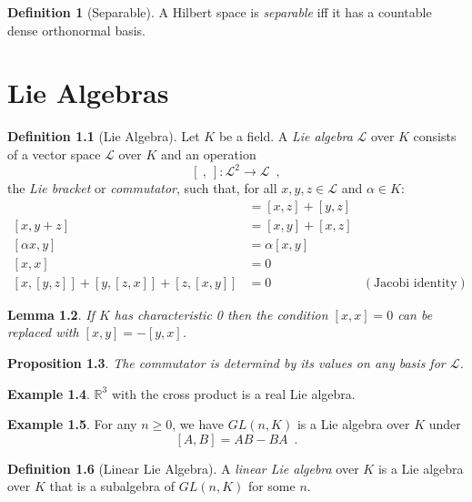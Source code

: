 \documentclass{book}
\newtheorem{prop}{Proposition}[chapter]
\newtheorem{lm}[prop]{Lemma}
\theoremstyle{definition}
\newtheorem{df}[prop]{Definition}
\newtheorem{ex}[prop]{Example}
\begin{document}
\begin{df}[Separable]
A Hilbert space is \emph{separable} iff it has a countable dense orthonormal basis.
\end{df}

\chapter{Lie Algebras}

\begin{df}[Lie Algebra]
Let $K$ be a field.
A \emph{Lie algebra} $\mathcal{L}$ over $K$ consists of a vector space $\mathcal{L}$ over $K$ and an operation
\[ [\ ,\ ] : \mathcal{L}^2 \rightarrow \mathcal{L} \enspace , \]
the \emph{Lie bracket} or \emph{commutator}, such that, for all $x,y,z \in \mathcal{L}$ and $\alpha \in K$:
\begin{align*}
[x+y,z] & = [x,z] + [y,z] \\
[x,y+z] & = [x,y] + [x,z] \\
[\alpha x,y] & = \alpha [x,y] \\
[x,x] & = 0 \\
[x,[y,z]] + [y,[z,x]] + [z,[x,y]] & = 0 & (\text{Jacobi identity})
\end{align*}
\end{df}

\begin{lm}
If $K$ has characteristic 0 then the condition $[x,x] = 0$ can be replaced with $[x,y] = -[y,x]$.
\end{lm}


\begin{prop}
The commutator is determind by its values on any basis for $\mathcal{L}$.
\end{prop}


\begin{ex}
$\mathbb{R}^3$ with the cross product is a real Lie algebra.
\end{ex}

\begin{ex}
For any $n \geq 0$, we have $GL(n,K)$ is a Lie algebra over $K$ under
\[ [A,B] = AB - BA \enspace . \]
\end{ex}

\begin{df}[Linear Lie Algebra]
A \emph{linear Lie algebra} over $K$ is a Lie algebra over $K$ that is a subalgebra of $GL(n,K)$ for some $n$.
\end{df}
\end{document}
